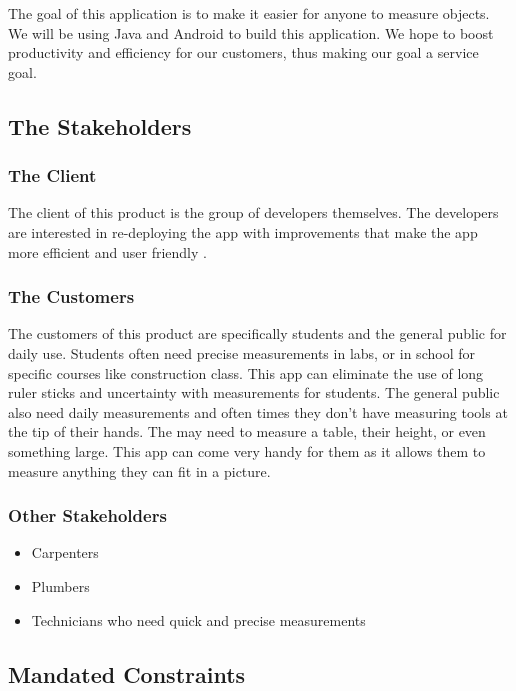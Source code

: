 \documentclass[12pt, titlepage]{article}
\begin{document}
\noindent The goal of this application is to make it easier for anyone to measure objects. We will be using Java and Android to build this application. We hope to boost productivity and efficiency for our customers, thus making our goal a service goal.

\subsection{The Stakeholders}

\subsubsection{The Client}
The client of this product is the group of developers themselves. The developers are interested in re-deploying the app with improvements that make the app more efficient and user friendly .

\subsubsection{The Customers}
The customers of this product are specifically students and the general public for daily use. Students often need precise measurements in labs, or in school for specific courses like construction class. This app can eliminate the use of long ruler sticks and uncertainty with measurements for students. The general public also need daily measurements and often times they don’t have measuring tools at the tip of their hands. The may need to measure a table, their height, or even something large. This app can come very handy for them as it allows them to measure anything they can fit in a picture. 

\subsubsection{Other Stakeholders}
\begin{itemize}
    \item Carpenters
    \item Plumbers
    \item Technicians who need quick and precise measurements
\end{itemize}
\subsection{Mandated Constraints}
\end{document}
